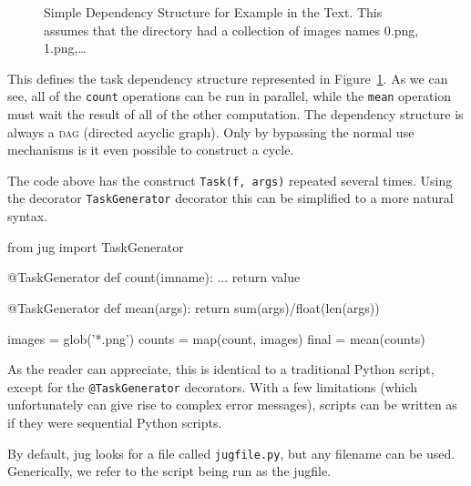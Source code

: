 \documentclass{article}
\let\code\texttt
\begin{document}
\begin{figure}
\begin{center}

\end{center}
\caption{Simple Dependency Structure for Example in the Text. This assumes that
the directory had a collection of images names 0.png, 1.png,\ldots}
\label{fig:jug-deps}
\end{figure}

This defines the task dependency structure represented in
Figure~\ref{fig:jug-deps}. As we can see, all of the \code{count} operations
can be run in parallel, while the \code{mean} operation must wait the result of
all of the other computation. The dependency structure is always a \textsc{dag}
(directed acyclic graph). Only by bypassing the normal use mechanisms is it
even possible to construct a cycle.

The code above has the construct \code{Task(f, args)} repeated several times.
Using the decorator \code{TaskGenerator} decorator this can be simplified to a
more natural syntax.

\begin{python}
from jug import TaskGenerator

@TaskGenerator
def count(imname):
    ...
    return value

@TaskGenerator
def mean(args):
    return sum(args)/float(len(args))

images = glob('*.png')
counts = map(count, images)
final = mean(counts)
\end{python}

As the reader can appreciate, this is identical to a traditional Python script,
except for the \code{@TaskGenerator} decorators. With a few limitations (which
unfortunately can give rise to complex error messages), scripts can be written
as if they were sequential Python scripts.

By default, jug looks for a file called \code{jugfile.py}, but any filename can
be used. Generically, we refer to the script being run as the jugfile.
\end{document}
